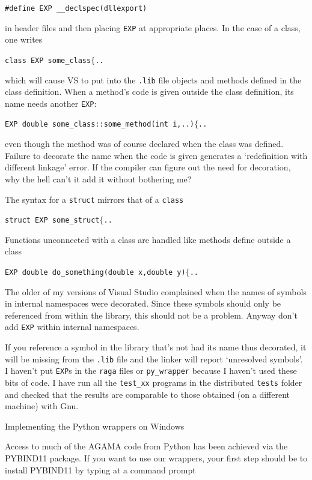 {\tt\#define EXP \_\_declspec(dllexport)} 

\noindent in header files and then placing {\tt EXP} at
appropriate places. In the case of a class, one writes

{\tt class EXP some\_class$\{$..}

\noindent which will cause VS to put into the {\tt.lib} file objects and
methods defined in the class definition. When a method's code is given
outside the class definition, its name needs another {\tt EXP}:

{\tt EXP double some\_class::some\_method(int i,..)$\{$..}

\noindent even though the method was of course declared when the class was defined.
Failure to decorate the name when the code is given generates a `redefinition with
different linkage' error. If the compiler can figure out the need for decoration, why the
hell can't it add it without bothering me?

\noindent The syntax for a {\tt struct} mirrors that of a {\tt class}

{\tt struct EXP some\_struct$\{$..}

\noindent Functions unconnected with a class are handled like methods define outside a
class

{\tt EXP double do\_something(double x,double y)$\{$..}

\noindent The older of my versions of Visual Studio complained when the names
of symbols in internal namespaces were decorated. Since these symbols should
only be referenced from within the library, this should not be a problem.
Anyway don't add {\tt EXP} within internal namespaces.

If you reference a symbol in the library that's not had its name thus
decorated, it will be missing from the {\tt.lib} file and the linker will
report `unresolved symbols'.  I haven't put {\tt EXP}s in the {\tt raga}
files or {\tt py\_wrapper} because I haven't used these bits of code. I have
run all the {\tt test\_xx} programs in the distributed {\tt tests} folder and
checked that the results are comparable to those obtained (on a different
machine) with Gnu.


\bsk
{}
\vfill\eject

\centerline{\titlefont Implementing the Python wrappers on Windows}
\msk\noindent
 Access to much of the AGAMA code from Python has been achieved via the
PYBIND11 package. If you want to use our wrappers, your first step should be
to install PYBIND11 by typing at a command prompt

